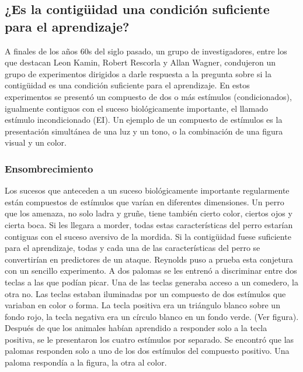 \documentclass[
  letterpaper,
]{book}
\begin{document}
\subsection{¿Es la contigüidad una condición suficiente para el
aprendizaje?}\label{es-la-contiguxfcidad-una-condiciuxf3n-suficiente-para-el-aprendizaje}

A finales de los años 60s del siglo pasado, un grupo de investigadores,
entre los que destacan Leon Kamin, Robert Rescorla y Allan Wagner,
condujeron un grupo de experimentos dirigidos a darle respuesta a la
pregunta sobre si la contigüidad es una condición suficiente para el
aprendizaje. En estos experimentos se presentó un compuesto de dos o más
estímulos (condicionados), igualmente contiguos con el suceso
biológicamente importante, el llamado estímulo incondicionado (EI). Un
ejemplo de un compuesto de estímulos es la presentación simultánea de
una luz y un tono, o la combinación de una figura visual y un color.

\subsubsection{Ensombrecimiento}\label{ensombrecimiento}

Los sucesos que anteceden a un suceso biológicamente importante
regularmente están compuestos de estímulos que varían en diferentes
dimensiones. Un perro que los amenaza, no solo ladra y gruñe, tiene
también cierto color, ciertos ojos y cierta boca. Si les llegara a
morder, todas estas características del perro estarían contiguas con el
suceso aversivo de la mordida. Si la contigüidad fuese suficiente para
el aprendizaje, todas y cada una de las características del perro se
convertirían en predictores de un ataque. Reynolds puso a prueba esta
conjetura con un sencillo experimento. A dos palomas se les entrenó a
discriminar entre dos teclas a las que podían picar. Una de las teclas
generaba acceso a un comedero, la otra no. Las teclas estaban iluminadas
por un compuesto de dos estímulos que variaban en color o forma. La
tecla positiva era un triángulo blanco sobre un fondo rojo, la tecla
negativa era un círculo blanco en un fondo verde. (Ver figura). Después
de que los animales habían aprendido a responder solo a la tecla
positiva, se le presentaron los cuatro estímulos por separado. Se
encontró que las palomas responden solo a uno de los dos estímulos del
compuesto positivo. Una paloma respondía a la figura, la otra al color.
\end{document}
